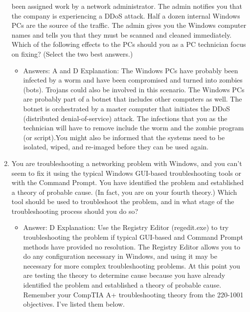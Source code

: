 \documentclass{article}
\begin{document}
\begin{enumerate}
been assigned work by a network administrator. The admin notifies
you that the company is experiencing a DDoS attack. Half a dozen
internal Windows PCs are the source of the traffic. The admin
gives you the Windows computer names and tells you that they
must be scanned and cleaned immediately. Which of the following
effects to the PCs should you as a PC technician focus on fixing?
(Select the two best answers.)
    \begin{itemize}
        \item Answers: A and D
Explanation: The Windows PCs have probably been infected by a worm and have been
compromised and turned into zombies (bots). Trojans could also be involved in this scenario.
The Windows PCs are probably part of a botnet that includes other computers as
well. The botnet is orchestrated by a master computer that initiates the DDoS (distributed
denial-of-service) attack. The infections that you as the technician will have to remove
include the worm and the zombie program (or script).You might also be informed that
the systems need to be isolated, wiped, and re-imaged before they can be used again.
    \end{itemize}
    \item You are troubleshooting a networking problem with Windows, and
you can’t seem to fix it using the typical Windows GUI-based troubleshooting
tools or with the Command Prompt. You have identified
the problem and established a theory of probable cause. (In
fact, you are on your fourth theory.) Which tool should be used to
troubleshoot the problem, and in what stage of the troubleshooting
process should you do so?
    \begin{itemize}
        \item Answer: D
Explanation: Use the Registry Editor (regedit.exe) to try troubleshooting the problem
if typical GUI-based and Command Prompt methods have provided no resolution.
The Registry Editor allows you to do any configuration necessary in Windows, and
using it may be necessary for more complex troubleshooting problems. At this point
you are testing the theory to determine cause because you have already identified the
problem and established a theory of probable cause. Remember your CompTIA A+
troubleshooting theory from the 220-1001 objectives. I’ve listed them below.
    \end{itemize}
    
\end{enumerate}
\end{document}
